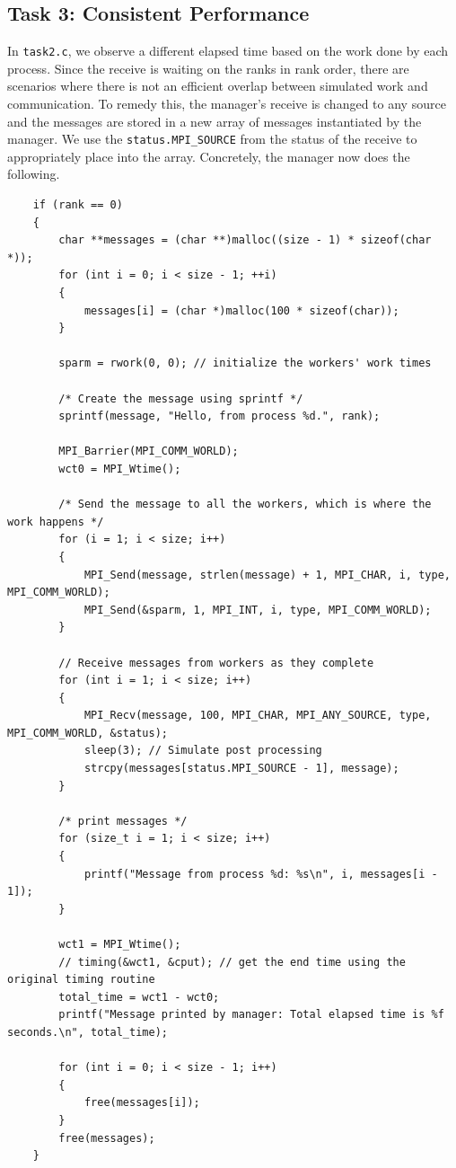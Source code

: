 \documentclass{article}
\begin{document}
\subsection{Task 3: Consistent Performance}
In \texttt{task2.c}, we observe a different elapsed time based on the work 
done by each process. Since the receive is waiting on the ranks in rank order, 
there are scenarios where there is not an efficient overlap between simulated work and 
communication. To remedy this, the manager's receive is changed to any source 
and the messages are stored in a new array of messages instantiated by the manager. 
We use the \texttt{status.MPI\_SOURCE} from the status of the receive to appropriately 
place into the array. Concretely, the manager now does the following.
\begin{lstlisting}
    if (rank == 0)
    {
        char **messages = (char **)malloc((size - 1) * sizeof(char *));
        for (int i = 0; i < size - 1; ++i)
        {
            messages[i] = (char *)malloc(100 * sizeof(char));
        }

        sparm = rwork(0, 0); // initialize the workers' work times

        /* Create the message using sprintf */
        sprintf(message, "Hello, from process %d.", rank);

        MPI_Barrier(MPI_COMM_WORLD);
        wct0 = MPI_Wtime();

        /* Send the message to all the workers, which is where the work happens */
        for (i = 1; i < size; i++)
        {
            MPI_Send(message, strlen(message) + 1, MPI_CHAR, i, type, MPI_COMM_WORLD);
            MPI_Send(&sparm, 1, MPI_INT, i, type, MPI_COMM_WORLD);
        }

        // Receive messages from workers as they complete
        for (int i = 1; i < size; i++)
        {
            MPI_Recv(message, 100, MPI_CHAR, MPI_ANY_SOURCE, type, MPI_COMM_WORLD, &status);
            sleep(3); // Simulate post processing
            strcpy(messages[status.MPI_SOURCE - 1], message);
        }

        /* print messages */
        for (size_t i = 1; i < size; i++)
        {
            printf("Message from process %d: %s\n", i, messages[i - 1]);
        }

        wct1 = MPI_Wtime();
        // timing(&wct1, &cput); // get the end time using the original timing routine
        total_time = wct1 - wct0;
        printf("Message printed by manager: Total elapsed time is %f seconds.\n", total_time);

        for (int i = 0; i < size - 1; i++)
        {
            free(messages[i]);
        }
        free(messages);
    }
\end{lstlisting}
\end{document}
